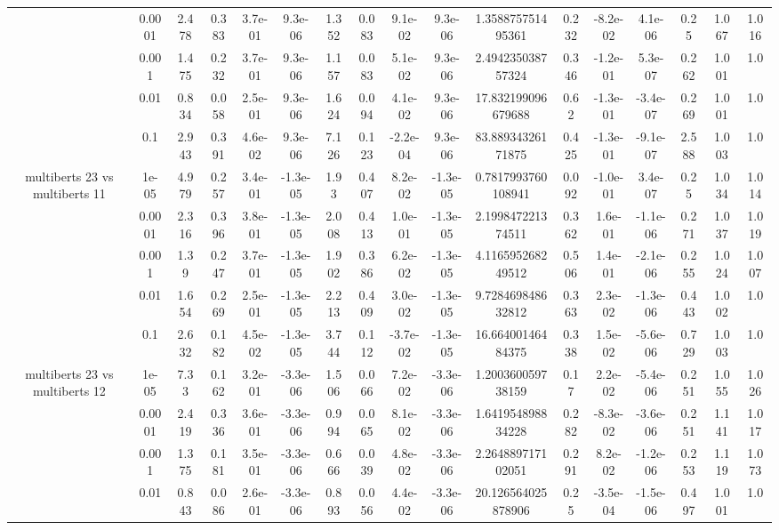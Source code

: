 \begin{tabular}{|c|c|c|c|c|c|c|c|c|c|c|c|c|c|c|c|c|}
 & 0.0001 & 2.478 & 0.383 & 3.7e-01 & 9.3e-06 & 1.352 & 0.083 & 9.1e-02 & 9.3e-06 & 1.358875751495361 & 0.232 & -8.2e-02 & 4.1e-06 & 0.25 & 1.067 & 1.016 \\
 & 0.001 & 1.475 & 0.232 & 3.7e-01 & 9.3e-06 & 1.157 & 0.083 & 5.1e-02 & 9.3e-06 & 2.494235038757324 & 0.346 & -1.2e-01 & 5.3e-07 & 0.262 & 1.001 & 1.0 \\
 & 0.01 & 0.834 & 0.058 & 2.5e-01 & 9.3e-06 & 1.624 & 0.094 & 4.1e-02 & 9.3e-06 & 17.832199096679688 & 0.62 & -1.3e-01 & -3.4e-07 & 0.269 & 1.001 & 1.0 \\
 & 0.1 & 2.943 & 0.391 & 4.6e-02 & 9.3e-06 & 7.126 & 0.123 & -2.2e-04 & 9.3e-06 & 83.88934326171875 & 0.425 & -1.3e-01 & -9.1e-07 & 2.588 & 1.003 & 1.0 \\
\hline
\multirow{5}{*}{multiberts 23 vs multiberts 11} & 1e-05 & 4.979 & 0.257 & 3.4e-01 & -1.3e-05 & 1.93 & 0.407 & 8.2e-02 & -1.3e-05 & 0.7817993760108941 & 0.092 & -1.0e-01 & 3.4e-07 & 0.25 & 1.034 & 1.014 \\
 & 0.0001 & 2.316 & 0.396 & 3.8e-01 & -1.3e-05 & 2.008 & 0.413 & 1.0e-01 & -1.3e-05 & 2.199847221374511 & 0.362 & 1.6e-01 & -1.1e-06 & 0.271 & 1.037 & 1.019 \\
 & 0.001 & 1.39 & 0.247 & 3.7e-01 & -1.3e-05 & 1.902 & 0.386 & 6.2e-02 & -1.3e-05 & 4.116595268249512 & 0.506 & 1.4e-01 & -2.1e-06 & 0.255 & 1.024 & 1.007 \\
 & 0.01 & 1.654 & 0.269 & 2.5e-01 & -1.3e-05 & 2.213 & 0.409 & 3.0e-02 & -1.3e-05 & 9.728469848632812 & 0.363 & 2.3e-02 & -1.3e-06 & 0.443 & 1.002 & 1.0 \\
 & 0.1 & 2.632 & 0.182 & 4.5e-02 & -1.3e-05 & 3.744 & 0.112 & -3.7e-02 & -1.3e-05 & 16.66400146484375 & 0.338 & 1.5e-02 & -5.6e-06 & 0.729 & 1.003 & 1.0 \\
\hline
\multirow{5}{*}{multiberts 23 vs multiberts 12} & 1e-05 & 7.33 & 0.162 & 3.2e-01 & -3.3e-06 & 1.506 & 0.066 & 7.2e-02 & -3.3e-06 & 1.200360059738159 & 0.17 & 2.2e-02 & -5.4e-06 & 0.251 & 1.055 & 1.026 \\
 & 0.0001 & 2.419 & 0.336 & 3.6e-01 & -3.3e-06 & 0.994 & 0.065 & 8.1e-02 & -3.3e-06 & 1.641954898834228 & 0.282 & -8.3e-02 & -3.6e-06 & 0.251 & 1.141 & 1.017 \\
 & 0.001 & 1.375 & 0.181 & 3.5e-01 & -3.3e-06 & 0.666 & 0.039 & 4.8e-02 & -3.3e-06 & 2.264889717102051 & 0.291 & 8.2e-02 & -1.2e-06 & 0.253 & 1.119 & 1.073 \\
 & 0.01 & 0.843 & 0.086 & 2.6e-01 & -3.3e-06 & 0.893 & 0.056 & 4.4e-02 & -3.3e-06 & 20.126564025878906 & 0.25 & -3.5e-04 & -1.5e-06 & 0.497 & 1.001 & 1.0 \\

\end{tabular}
